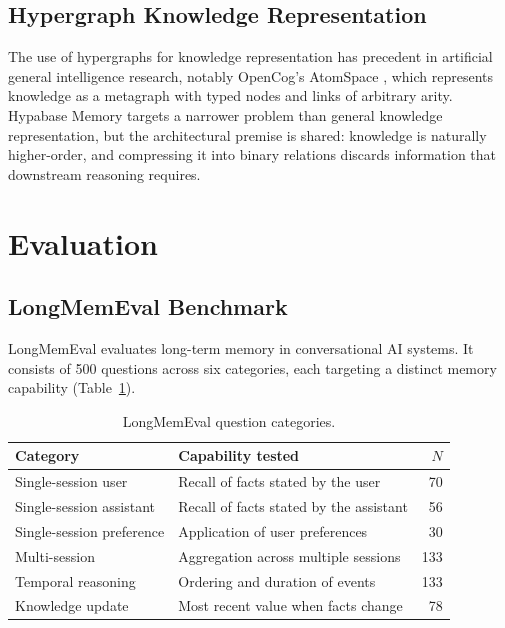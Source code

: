 \documentclass[11pt,a4paper]{article}
\begin{document}
\subsection{Hypergraph Knowledge Representation}

The use of hypergraphs for knowledge representation has precedent in artificial general intelligence research, notably OpenCog's AtomSpace \citep{goertzel2014engineering}, which represents knowledge as a metagraph with typed nodes and links of arbitrary arity. Hypabase Memory targets a narrower problem than general knowledge representation, but the architectural premise is shared: knowledge is naturally higher-order, and compressing it into binary relations discards information that downstream reasoning requires.

\section{Evaluation}

\subsection{LongMemEval Benchmark}

LongMemEval \citep{wang2025longmemeval} evaluates long-term memory in conversational AI systems. It consists of 500 questions across six categories, each targeting a distinct memory capability (Table~\ref{tab:categories}).

\begin{table}[h]
\centering
\caption{LongMemEval question categories.}
\label{tab:categories}
\begin{tabular}{@{}llr@{}}
\toprule
Category & Capability tested & $N$ \\
\midrule
Single-session user      & Recall of facts stated by the user        & 70  \\
Single-session assistant & Recall of facts stated by the assistant    & 56  \\
Single-session preference & Application of user preferences           & 30  \\
Multi-session            & Aggregation across multiple sessions       & 133 \\
Temporal reasoning       & Ordering and duration of events            & 133 \\
Knowledge update         & Most recent value when facts change        & 78  \\
\bottomrule
\end{tabular}
\end{table}
\end{document}
